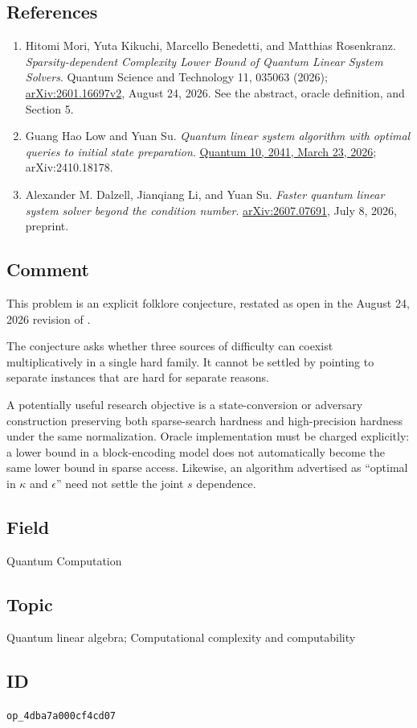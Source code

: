 \subsection*{References}

\begin{enumerate}[label={},leftmargin=4.8em,labelsep=0.5em]
  \footnotesize
  \item[\textup{[Mori26]}]\label{ref:4dba-mori26}
  Hitomi Mori, Yuta Kikuchi, Marcello Benedetti, and Matthias Rosenkranz. \emph{Sparsity-dependent Complexity Lower Bound of Quantum Linear System Solvers}. Quantum Science and Technology 11, 035063 (2026); \href{https://arxiv.org/html/2601.16697v2}{arXiv:2601.16697v2}, August 24, 2026. See the abstract, oracle definition, and Section 5.

  \item[\textup{[Low26]}]\label{ref:4dba-low26}
  Guang Hao Low and Yuan Su. \emph{Quantum linear system algorithm with optimal queries to initial state preparation}. \href{https://quantum-journal.org/papers/q-2026-03-23-2041/}{Quantum 10, 2041, March 23, 2026}; arXiv:2410.18178.

  \item[\textup{[Dalzell26]}]\label{ref:4dba-dalzell26}
  Alexander M. Dalzell, Jianqiang Li, and Yuan Su. \emph{Faster quantum linear system solver beyond the condition number}. \href{https://arxiv.org/abs/2607.07691}{arXiv:2607.07691}, July 8, 2026, preprint.
\end{enumerate}

\subsection*{Comment}

This problem is an explicit folklore conjecture, restated as open in the August 24, 2026 revision of .

The conjecture asks whether three sources of difficulty can coexist multiplicatively in a single hard family. It cannot be settled by pointing to separate instances that are hard for separate reasons.

A potentially useful research objective is a state-conversion or adversary construction preserving both sparse-search hardness and high-precision hardness under the same normalization. Oracle implementation must be charged explicitly: a lower bound in a block-encoding model does not automatically become the same lower bound in sparse access. Likewise, an algorithm advertised as “optimal in $\kappa$ and $\epsilon$” need not settle the joint $s$ dependence.

\subsection*{Field}

Quantum Computation

\subsection*{Topic}

Quantum linear algebra; Computational complexity and computability

\subsection*{ID}

\texttt{op\_4dba7a000cf4cd07}
